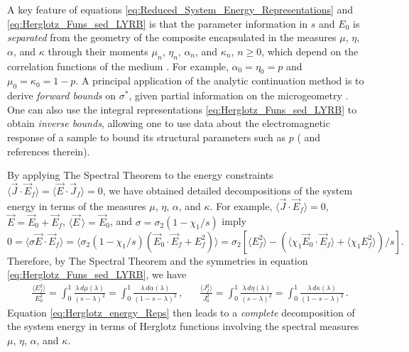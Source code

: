 \documentclass[english,12pt,jmp,graphicx]{revtex4-1}
\begin{document}
A key feature of equations
\eqref{eq:Reduced_System_Energy_Representations} and
\eqref{eq:Herglotz_Funs_sed_LYRB} is 
that the parameter information in $s$ and $E_0$ is {\it separated}
from the geometry of the composite encapsulated in the 
measures $\mu$, $\eta$, $\alpha$, and $\kappa$ through their moments $\mu_n$, $\eta_n$,
$\alpha_n$, and $\kappa_n$, $n\geq0$, which depend on the correlation functions of the
medium \cite{Golden:CMP-473}. For example, $\alpha_0=\eta_0=p$ and
$\mu_0=\kappa_0=1-p$. A principal application of the analytic continuation
method is to derive \emph{forward bounds} on $\sigma^*$, given partial
information on the microgeometry
\cite{Bergman:PRL-1285,Milton:APL-300,Golden:CMP-473,Bergman:AP-78}. One
can also use the integral representations
\eqref{eq:Herglotz_Funs_sed_LYRB} to obtain \emph{inverse bounds},
allowing one to use data about the electromagnetic response of a
sample to bound its structural parameters such as $p$
(\cite{Golden:JoB:337} and references therein). 
         
By applying The Spectral Theorem to the energy constraints
$\langle\vec{J}\cdot\vec{E}_f\rangle=\langle\vec{E}\cdot\vec{J}_f\rangle=0$, we have obtained detailed
decompositions of the system energy in terms of the measures $\mu$, $\eta$,
$\alpha$, and $\kappa$. For example, $\langle\vec{J}\cdot\vec{E}_f\rangle=0$,
$\vec{E}=\vec{E}_0+\vec{E}_f$, $\langle\vec{E}\,\rangle=\vec{E}_0$, and
$\sigma=\sigma_2(1-\chi_1/s)$ imply $0=\langle\sigma\vec{E}\cdot\vec{E}_f\rangle=\langle\sigma_2(1-\chi_1/s)(\vec{E}_0\cdot\vec{E}_f+E_f^2)\rangle
  =\sigma_2\left[\langle E_f^2\rangle- (\langle\chi_1\vec{E}_0\cdot\vec{E}_f\rangle
      + \langle\chi_1E_f^2\rangle)/s\right].$
Therefore, by The Spectral Theorem \cite{Reed-1980} and the symmetries
in equation \eqref{eq:Herglotz_Funs_sed_LYRB}, we have
%
\begin{align}\label{eq:Herglotz_energy_Reps}
 &\frac{\langle E_f^2\rangle}{E_0^2}=\int_0^1 \frac{\lambda\,d\mu(\lambda)}{(s-\lambda)^2}
           =\int_0^1 \frac{\lambda\,d\alpha(\lambda)}{(1-s-\lambda)^2}\,, &&
 \frac{\langle J_f^2\rangle}{J_0^2}=\int_0^1 \frac{\lambda\,d\eta(\lambda)}{(s-\lambda)^2}
           =\int_0^1 \frac{\lambda\,d\kappa(\lambda)}{(1-s-\lambda)^2}\,.
\end{align}
%
Equation \eqref{eq:Herglotz_energy_Reps} then leads to a
\emph{complete} decomposition of the system energy in terms of
Herglotz functions involving the spectral measures $\mu$, $\eta$, $\alpha$, and
$\kappa$.
\end{document}
